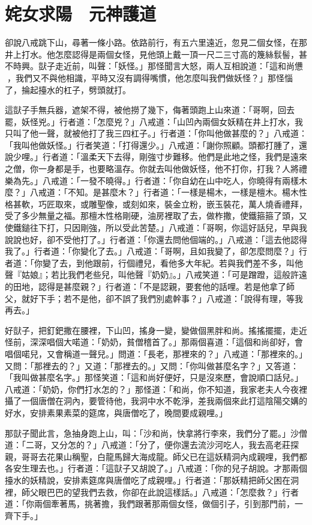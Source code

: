 
\chapter{姹女求陽　元神護道}

卻說八戒跳下山，尋著一條小路。依路前行，有五六里遠近，忽見二個女怪，在那井上打水。他怎麼認得是兩個女怪，見他頭上戴一頂一尺二三寸高的篾絲䯼髻，甚不時興。獃子走近前，叫聲：「妖怪。」那怪聞言大怒，兩人互相說道：「這和尚憊𪬯，我們又不與他相識，平時又沒有調得嘴慣，他怎麼叫我們做妖怪？」那怪惱了，掄起擡水的杠子，劈頭就打。

這獃子手無兵器，遮架不得，被他撈了幾下，侮著頭跑上山來道：「哥啊，回去罷，妖怪兇。」行者道：「怎麼兇？」八戒道：「山凹內兩個女妖精在井上打水，我只叫了他一聲，就被他打了我三四杠子。」行者道：「你叫他做甚麼的？」八戒道：「我叫他做妖怪。」行者笑道：「打得還少。」八戒道：「謝你照顧。頭都打腫了，還說少哩。」行者道：「溫柔天下去得，剛強寸步難移。他們是此地之怪，我們是遠來之僧，你一身都是手，也要略溫存。你就去叫他做妖怪，他不打你，打我？人將禮樂為先。」八戒道：「一發不曉得。」行者道：「你自幼在山中吃人，你曉得有兩樣木麼？」八戒道：「不知。是甚麼木？」行者道：「一樣是楊木，一樣是檀木。楊木性格甚軟，巧匠取來，或雕聖像，或刻如來，裝金立粉，嵌玉裝花，萬人燒香禮拜，受了多少無量之福。那檀木性格剛硬，油房裡取了去，做柞撒，使鐵箍箍了頭，又使鐵鎚往下打，只因剛強，所以受此苦楚。」八戒道：「哥啊，你這好話兒，早與我說說也好，卻不受他打了。」行者道：「你還去問他個端的。」八戒道：「這去他認得我了。」行者道：「你變化了去。」八戒道：「哥啊，且如我變了，卻怎麼問麼？」行者道：「你變了去，到他跟前，行個禮兒，看他多大年紀。若與我們差不多，叫他聲『姑娘』；若比我們老些兒，叫他聲『奶奶』。」八戒笑道：「可是蹭蹬，這般許遠的田地，認得是甚麼親？」行者道：「不是認親，要套他的話哩。若是他拿了師父，就好下手；若不是他，卻不誤了我們別處幹事？」八戒道：「說得有理，等我再去。」

好獃子，把釘鈀撒在腰裡，下山凹，搖身一變，變做個黑胖和尚。搖搖擺擺，走近怪前，深深唱個大喏道：「奶奶，貧僧稽首了。」那兩個喜道：「這個和尚卻好，會唱個喏兒，又會稱道一聲兒。」問道：「長老，那裡來的？」八戒道：「那裡來的。」又問：「那裡去的？」又道：「那裡去的。」又問：「你叫做甚麼名字？」又答道：「我叫做甚麼名字。」那怪笑道：「這和尚好便好，只是沒來歷，會說順口話兒。」八戒道：「奶奶，你們打水怎的？」那怪道：「和尚，你不知道，我家老夫人今夜裡攝了一個唐僧在洞內，要管待他，我洞中水不乾淨，差我兩個來此打這陰陽交媾的好水，安排素果素菜的筵席，與唐僧吃了，晚間要成親哩。」

那獃子聞此言，急抽身跑上山，叫：「沙和尚，快拿將行李來，我們分了罷。」沙僧道：「二哥，又分怎的？」八戒道：「分了，便你還去流沙河吃人，我去高老莊探親，哥哥去花果山稱聖，白龍馬歸大海成龍。師父已在這妖精洞內成親哩，我們都各安生理去也。」行者道：「這獃子又胡說了。」八戒道：「你的兒子胡說。才那兩個擡水的妖精說，安排素筵席與唐僧吃了成親哩。」行者道：「那妖精把師父困在洞裡，師父眼巴巴的望我們去救，你卻在此說這樣話。」八戒道：「怎麼救？」行者道：「你兩個牽著馬，挑著擔，我們跟著那兩個女怪，做個引子，引到那門前，一齊下手。」

